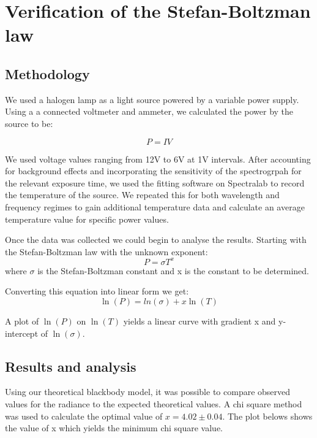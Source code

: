 \documentclass{article}%
\begin{document}
%
\section{Verification of the Stefan{-}Boltzman law}%
\label{sec:VerificationoftheStefan{-}Boltzmanlaw}%
%
\subsection{Methodology}%
\label{subsec:Methodology}%
We used a halogen lamp as a light source powered by a variable power supply. 
Using a a connected voltmeter and ammeter, we calculated the power by the source to be:

\begin{equation}
  P = IV
\end{equation}


We used voltage values ranging from 12V to 6V at 1V intervals.
After accounting for background effects and incorporating the sensitivity of the spectrogrpah for the relevant exposure time,
we used the fitting software on Spectralab to record the temperature of the source. 
We repeated this for both wavelength and frequency regimes to 
gain additional temperature data and calculate an 
average temperature value for specific power values.\par


Once the data was collected we could begin to analyse the results. Starting with the Stefan-Boltzman law with the unknown exponent:
\begin{equation}
  P = \sigma T^x
\end{equation}
where $ \sigma $ is the Stefan-Boltzman constant and x is the constant to be determined. \par

Converting this equation into linear form we get:
\begin{equation}
  \ln(P) = ln(\sigma) + x \ln(T)
\end{equation}

A plot of $\ln(P)$ on $\ln(T)$ yields a linear curve with gradient x and y-intercept of $\ln(\sigma)$. \par

%
\subsection{Results and analysis}%
\label{subsec:Results and analysis}%
Using our theoretical blackbody model, it was possible to compare observed values for the radiance to the expected theoretical values.
A chi square method was used to calculate the optimal value of $x=4.02 \pm 0.04$. The plot belows shows the value of x which yields the minimum chi square value. 
\end{document}
